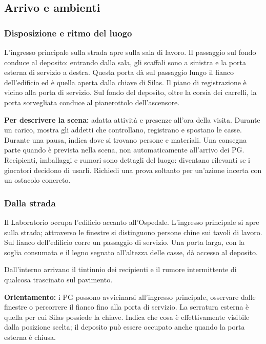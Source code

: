 \documentclass[11pt,a4paper]{article}
\begin{document}
\subsection{Arrivo e ambienti}
\subsubsection{Disposizione e ritmo del luogo}
L'ingresso principale sulla strada apre sulla sala di lavoro. Il passaggio sul fondo conduce al deposito: entrando dalla sala, gli scaffali sono a sinistra e la porta esterna di servizio a destra. Questa porta dà sul passaggio lungo il fianco dell'edificio ed è quella aperta dalla chiave di Silas. Il piano di registrazione è vicino alla porta di servizio. Sul fondo del deposito, oltre la corsia dei carrelli, la porta sorvegliata conduce al pianerottolo dell'ascensore.

\textbf{Per descrivere la scena:} adatta attività e presenze all'ora della visita. Durante un carico, mostra gli addetti che controllano, registrano e spostano le casse. Durante una pausa, indica dove si trovano persone e materiali. Una consegna parte quando è prevista nella scena, non automaticamente all'arrivo dei PG. Recipienti, imballaggi e rumori sono dettagli del luogo: diventano rilevanti se i giocatori decidono di usarli. Richiedi una prova soltanto per un'azione incerta con un ostacolo concreto.

\subsubsection{Dalla strada}
\begin{readaloud}
Il Laboratorio occupa l'edificio accanto all'Ospedale. L'ingresso principale si apre sulla strada; attraverso le finestre si distinguono persone chine sui tavoli di lavoro. Sul fianco dell'edificio corre un passaggio di servizio. Una porta larga, con la soglia consumata e il legno segnato all'altezza delle casse, dà accesso al deposito.

Dall'interno arrivano il tintinnio dei recipienti e il rumore intermittente di qualcosa trascinato sul pavimento.
\end{readaloud}

\textbf{Orientamento:} i PG possono avvicinarsi all'ingresso principale, osservare dalle finestre o percorrere il fianco fino alla porta di servizio. La serratura esterna è quella per cui Silas possiede la chiave. Indica che cosa è effettivamente visibile dalla posizione scelta; il deposito può essere occupato anche quando la porta esterna è chiusa.
\end{document}
